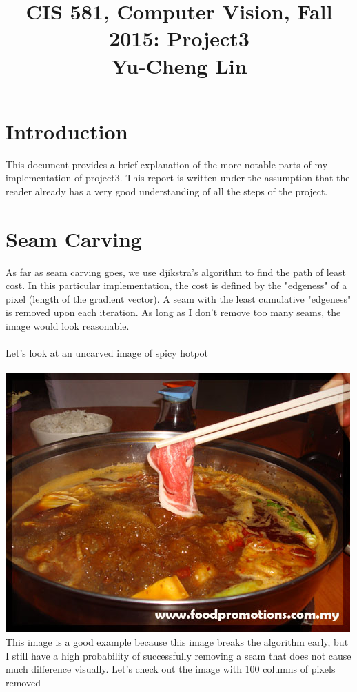 \documentclass[english]{article}
\title{CIS 581, Computer Vision, Fall 2015: Project3 \\
Yu-Cheng Lin}
\date{}
\begin{document}
\maketitle
\section*{Introduction}
This document provides a brief explanation of the more notable parts of my implementation of project3. This report is written under the assumption that the reader already has a very good understanding of all the steps of the project.
\section*{Seam Carving}
As far as seam carving goes, we use djikstra's algorithm to find the path of least cost. In this particular implementation, the cost is defined by the "edgeness" of a pixel (length of the gradient vector). A seam with the least cumulative "edgeness" is removed upon each iteration. As long as I don't remove too many seams, the image would look reasonable.
\\\\
Let's look at an uncarved image of spicy hotpot\\\\
\includegraphics[scale=0.8]{carving/hotpot.jpg}\\
This image is a good example because this image breaks the algorithm early, but I still have a high probability of successfully removing a seam that does not cause much difference visually. Let's check out the image with 100 columns of pixels removed\\\\
\end{document}
